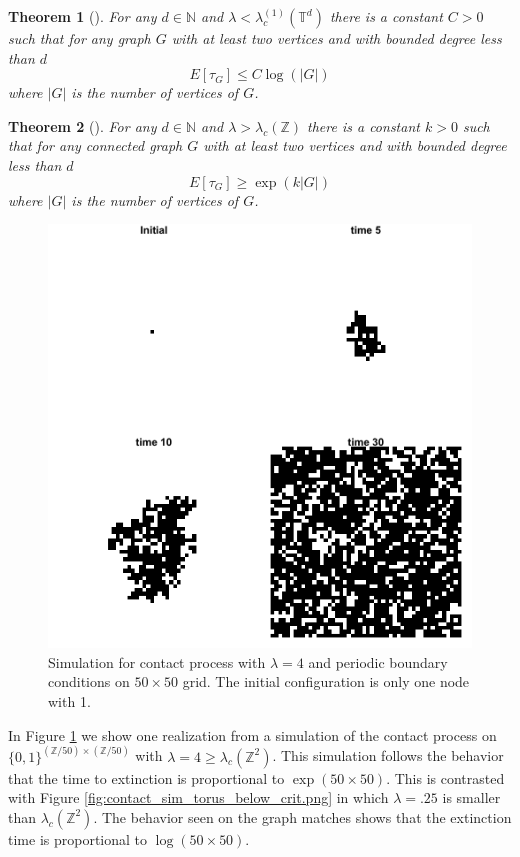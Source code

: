 \documentclass{article}
\theoremstyle{plain}
\newtheorem{theorem}{Theorem}[section]
\theoremstyle{definition}
\theoremstyle{remark}
\numberwithin{equation}{section}
\newcommand{\N}{\mathbb{N}}
\newcommand{\Z}{\mathbb{Z}}
\begin{document}
\begin{theorem}[\cite{mourrat2014phase}]\label{thm:contact_finite_log}
For any $d \in \N$ and $\lambda < \lambda_c^{(1)}(\mathbb T^d)$ there is a constant $C > 0$ such that for any graph $G$ with at least two vertices and with bounded degree less than $d$
$$
E[\tau_{G}] \leq C \log(|G|)
$$
where $|G|$ is the number of vertices of $G$.
\end{theorem}

\begin{theorem}[\cite{Mountford2016}] \label{thm:contact_finite_exp}
For any $d \in \N$ and $\lambda > \lambda_c(\Z)$ there is a constant $k > 0$ such that for any connected graph $G$ with at least two vertices and with bounded degree less than $d$
$$
E[\tau_{G}] \geq \exp(k |G|)
$$
where $|G|$ is the number of vertices of $G$.
\end{theorem}

\begin{figure}[H]
  \centering
    \includegraphics[width=.80\textwidth]{figures/contact_simulation_torus_25.png}
   \caption{Simulation for contact process with $\lambda = 4$ and periodic boundary conditions on $50 \times 50$ grid. The initial configuration is only one node with 1.}
  \label{fig:contact_sim_torus_above_crit.png}
\end{figure}

In Figure \ref{fig:contact_sim_torus_above_crit.png} we show one realization from a simulation of the contact process on $\{0,1\}^{(\Z/50) \times (\Z/50)}$ with $\lambda = 4 \geq \lambda_c(\Z^2)$.
This simulation follows the behavior that the time to extinction is proportional to $\exp(50 \times 50)$.
This is contrasted with Figure \ref{fig:contact_sim_torus_below_crit.png} in which $\lambda = .25$ is smaller than $\lambda_c(\Z^2)$.
The behavior seen on the graph matches shows that the extinction time is proportional to $\log(50 \times 50)$.
\end{document}
